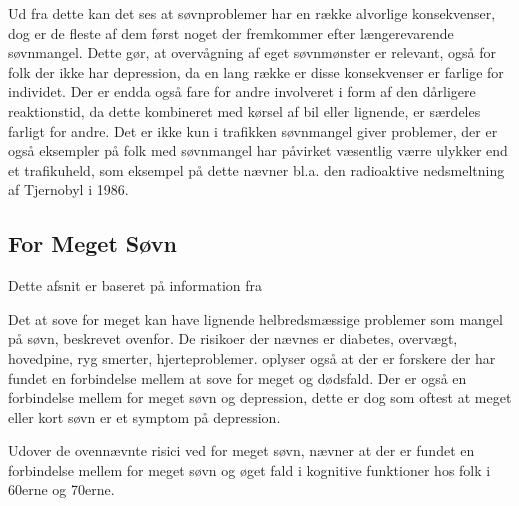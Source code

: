 Ud fra dette kan det ses at søvnproblemer har en række alvorlige konsekvenser, dog er de fleste af dem først noget der fremkommer efter længerevarende søvnmangel.
Dette gør, at overvågning af eget søvnmønster er relevant, også for folk der ikke har depression, da en lang række er disse konsekvenser er farlige for individet.
Der er endda også fare for andre involveret i form af den dårligere reaktionstid, da dette kombineret med kørsel af bil eller lignende, er særdeles farligt for andre.
Det er ikke kun i trafikken søvnmangel giver problemer, der er også eksempler på folk med søvnmangel har påvirket væsentlig værre ulykker end et trafikuheld, som eksempel på dette nævner \citet{misc:tenThings} bl.a. den radioaktive nedsmeltning af Tjernobyl i 1986.

\subsection{For Meget Søvn}
Dette afsnit er baseret på information fra \citep{misc:oversleep, misc:longsleepsurvey}

Det at sove for meget kan have lignende helbredsmæssige problemer som mangel på søvn, beskrevet ovenfor.
De risikoer der nævnes er diabetes, overvægt, hovedpine, ryg smerter, hjerteproblemer.
\citet{misc:oversleep} oplyser også at der er forskere der har fundet en forbindelse mellem at sove for meget og dødsfald.
Der er også en forbindelse mellem for meget søvn og depression, dette er dog som oftest at meget eller kort søvn er et symptom på depression.

Udover de ovennævnte risici ved for meget søvn, nævner \citet{misc:brainsleep} at der er fundet en forbindelse mellem for meget søvn og øget fald i kognitive funktioner hos folk i 60erne og 70erne.

